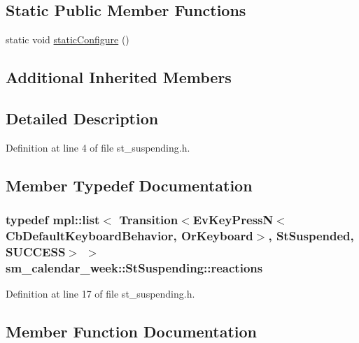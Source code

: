 \subsection*{Static Public Member Functions}
\begin{DoxyCompactItemize}
\item 
static void \hyperlink{structsm__calendar__week_1_1StSuspending_ae92cf179f7541e026e8472738ad3ca8b}{static\+Configure} ()
\end{DoxyCompactItemize}
\subsection*{Additional Inherited Members}


\subsection{Detailed Description}


Definition at line 4 of file st\+\_\+suspending.\+h.



\subsection{Member Typedef Documentation}
\subsubsection[{\texorpdfstring{reactions}{reactions}}]{\setlength{\rightskip}{0pt plus 5cm}typedef mpl\+::list$<$ Transition$<$Ev\+Key\+PressN$<$Cb\+Default\+Keyboard\+Behavior, {\bf Or\+Keyboard}$>$, {\bf St\+Suspended}, {\bf S\+U\+C\+C\+E\+SS}$>$ $>$ {\bf sm\+\_\+calendar\+\_\+week\+::\+St\+Suspending\+::reactions}}\hypertarget{structsm__calendar__week_1_1StSuspending_a56ffaa24fc432b233121231269f6b035}{}\label{structsm__calendar__week_1_1StSuspending_a56ffaa24fc432b233121231269f6b035}


Definition at line 17 of file st\+\_\+suspending.\+h.



\subsection{Member Function Documentation}

